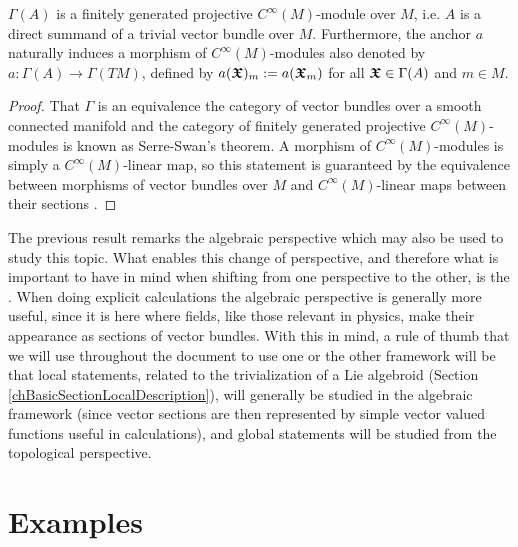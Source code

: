 \begin{proposition}
$\Gamma(A)$ is a finitely generated projective $C^\infty(M)$-module over $M$, i.e. $A$ is a direct summand of a trivial vector bundle over $M$. Furthermore, the anchor $a$ naturally induces a morphism of $C^\infty(M)$-modules also denoted by $a: \Gamma(A) \to \Gamma(TM)$, defined by $a(\bm{\mathfrak{X}})_m := a(\bm{\mathfrak{X}}_m)$ for all $\bm{\mathfrak{X}} \in \Gamma(A)$ and $m \in M$. 
\end{proposition}
\begin{proof}
That $\Gamma$ is an equivalence the category of vector bundles over a smooth connected manifold and the category of finitely generated projective $C^\infty(M)$-modules is known as Serre-Swan's theorem. A morphism of $C^\infty(M)$-modules is simply a $C^\infty(M)$-linear map, so this statement is guaranteed by the equivalence between morphisms of vector bundles over $M$ and $C^\infty(M)$-linear maps between their sections \cite{Tu2017}.
\end{proof}
The previous result remarks the algebraic perspective which may also be used to study this topic. What enables this change of perspective, and therefore what is important to have in mind when shifting from one perspective to the other, is the  \cite{Tu2017}. When doing explicit calculations the algebraic perspective is generally more useful, since it is here where fields, like those relevant in physics, make their appearance as sections of vector bundles. With this in mind, a rule of thumb that we will use throughout the document to use one or the other framework will be that local statements, related to the trivialization of a Lie algebroid (Section \ref{chBasicSectionLocalDescription}), will generally be studied in the algebraic framework (since vector sections are then represented by simple vector valued functions useful in calculations), and global statements will be studied from the topological perspective.

\section{Examples}

